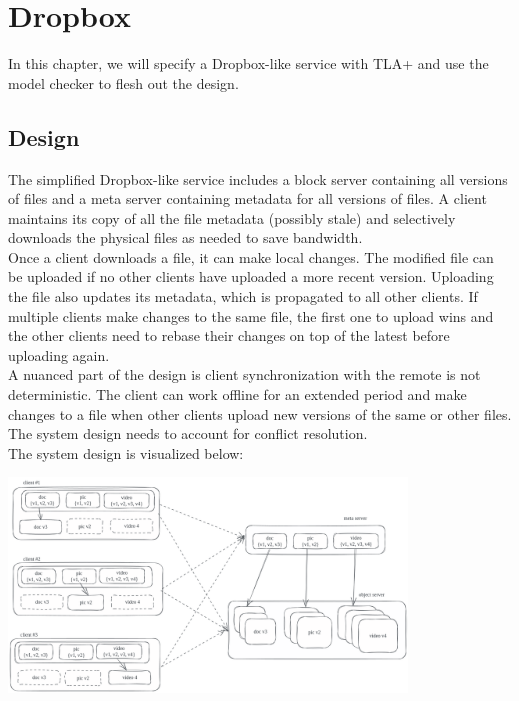 % 

\usetikzlibrary{arrows.meta} %

\chapter{Dropbox}

In this chapter, we will specify a Dropbox-like service with TLA+ and use the
model checker to flesh out the design.\\

\section{Design}

The simplified Dropbox-like service includes a block server containing all
versions of files and a meta server containing metadata for all versions of
files. A client maintains its copy of all the file metadata (possibly stale) and
selectively downloads the physical files as needed to save bandwidth.\\

Once a client downloads a file, it can make local changes. The modified file can
be uploaded if no other clients have uploaded a more recent version. Uploading
the file also updates its metadata, which is propagated to all other clients. If
multiple clients make changes to the same file, the first one to upload wins and
the other clients need to rebase their changes on top of the latest before
uploading again.\\

A nuanced part of the design is client synchronization with the remote is not
deterministic. The client can work offline for an extended period and make
changes to a file when other clients upload new versions of the same or other
files. The system design needs to account for conflict resolution.\\

The system design is visualized below:\\

\begin{center}
\includegraphics[width=300pt]{dropbox}
\end{center}

